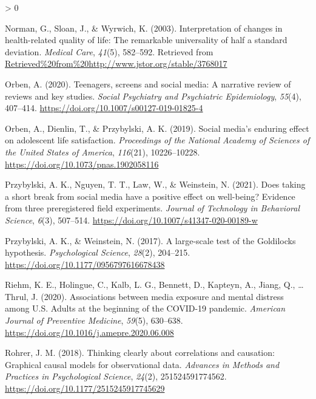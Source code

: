 \documentclass[
  english,
  man,floatsintext]{apa6}
\newlength{\cslhangindent}
\newenvironment{CSLReferences}[2] %
 {%
  \setlength{\parindent}{0pt}
  \ifodd #1 \everypar{\setlength{\hangindent}{\cslhangindent}}\ignorespaces\fi
  \ifnum #2 > 0
  \setlength{\parskip}{#2\baselineskip}
  \fi
 }%
 {}
\begin{document}
\begin{CSLReferences}{1}{0}
\leavevmode\hypertarget{ref-normanInterpretationChangesHealthrelated2003}{}%
Norman, G., Sloan, J., \& Wyrwich, K. (2003). Interpretation of changes in health-related quality of life: {The} remarkable universality of half a standard deviation. \emph{Medical Care}, \emph{41}(5), 582--592. Retrieved from \url{Retrieved\%20from\%20http://www.jstor.org/stable/3768017}

\leavevmode\hypertarget{ref-orbenTeenagersScreensSocial2020}{}%
Orben, A. (2020). Teenagers, screens and social media: A narrative review of reviews and key studies. \emph{Social Psychiatry and Psychiatric Epidemiology}, \emph{55}(4), 407--414. \url{https://doi.org/10.1007/s00127-019-01825-4}

\leavevmode\hypertarget{ref-orbenSocialMediaEnduring2019}{}%
Orben, A., Dienlin, T., \& Przybylski, A. K. (2019). Social media's enduring effect on adolescent life satisfaction. \emph{Proceedings of the National Academy of Sciences of the United States of America}, \emph{116}(21), 10226--10228. \url{https://doi.org/10.1073/pnas.1902058116}

\leavevmode\hypertarget{ref-przybylskiDoesTakingShort2021a}{}%
Przybylski, A. K., Nguyen, T. T., Law, W., \& Weinstein, N. (2021). Does taking a short break from social media have a positive effect on well-being? {Evidence} from three preregistered field experiments. \emph{Journal of Technology in Behavioral Science}, \emph{6}(3), 507--514. \url{https://doi.org/10.1007/s41347-020-00189-w}

\leavevmode\hypertarget{ref-przybylskiLargescaleTestGoldilocks2017}{}%
Przybylski, A. K., \& Weinstein, N. (2017). A large-scale test of the {Goldilocks} hypothesis. \emph{Psychological Science}, \emph{28}(2), 204--215. \url{https://doi.org/10.1177/0956797616678438}

\leavevmode\hypertarget{ref-riehmAssociationsMediaExposure2020}{}%
Riehm, K. E., Holingue, C., Kalb, L. G., Bennett, D., Kapteyn, A., Jiang, Q., \ldots{} Thrul, J. (2020). Associations between media exposure and mental distress among {U}.{S}. Adults at the beginning of the {COVID}-19 pandemic. \emph{American Journal of Preventive Medicine}, \emph{59}(5), 630--638. \url{https://doi.org/10.1016/j.amepre.2020.06.008}

\leavevmode\hypertarget{ref-rohrerThinkingClearlyCorrelations2018}{}%
Rohrer, J. M. (2018). Thinking clearly about correlations and causation: {Graphical} causal models for observational data. \emph{Advances in Methods and Practices in Psychological Science}, \emph{24}(2), 251524591774562. \url{https://doi.org/10.1177/2515245917745629}


\end{CSLReferences}
\end{document}
